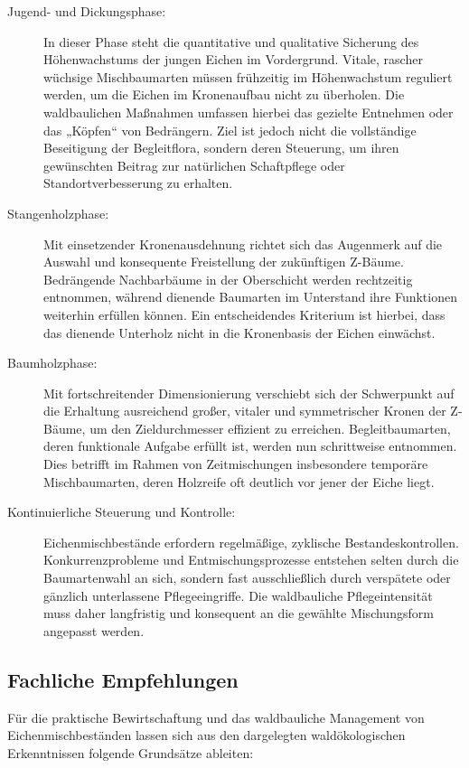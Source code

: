 \documentclass[twocolumn, bibliography=totoc, abstract=true]{scrartcl}
\begin{document}
\begin{description}
\item[Jugend- und Dickungsphase:] In dieser Phase steht die quantitative und qualitative Sicherung des Höhenwachstums der jungen Eichen im Vordergrund. Vitale, rascher wüchsige Mischbaumarten müssen frühzeitig im Höhenwachstum reguliert werden, um die Eichen im Kronenaufbau nicht zu überholen. Die waldbaulichen Maßnahmen umfassen hierbei das gezielte Entnehmen oder das „Köpfen“ von Bedrängern. Ziel ist jedoch nicht die vollständige Beseitigung der Begleitflora, sondern deren Steuerung, um ihren gewünschten Beitrag zur natürlichen Schaftpflege oder Standortverbesserung zu erhalten.
\item[Stangenholzphase:] Mit einsetzender Kronenausdehnung richtet sich das Augenmerk auf die Auswahl und konsequente Freistellung der zukünftigen Z-Bäume. Bedrängende Nachbarbäume in der Oberschicht werden rechtzeitig entnommen, während dienende Baumarten im Unterstand ihre Funktionen weiterhin erfüllen können. Ein entscheidendes Kriterium ist hierbei, dass das dienende Unterholz nicht in die Kronenbasis der Eichen einwächst.
\item[Baumholzphase:] Mit fortschreitender Dimensionierung verschiebt sich der Schwerpunkt auf die Erhaltung ausreichend großer, vitaler und symmetrischer Kronen der Z-Bäume, um den Zieldurchmesser effizient zu erreichen. Begleitbaumarten, deren funktionale Aufgabe erfüllt ist, werden nun schrittweise entnommen. Dies betrifft im Rahmen von Zeitmischungen insbesondere temporäre Mischbaumarten, deren Holzreife oft deutlich vor jener der Eiche liegt.
\item[Kontinuierliche Steuerung und Kontrolle:] Eichenmischbestände erfordern regelmäßige, zyklische Bestandeskontrollen. Konkurrenzprobleme und Entmischungsprozesse entstehen selten durch die Baumartenwahl an sich, sondern fast ausschließlich durch verspätete oder gänzlich unterlassene Pflegeeingriffe. Die waldbauliche Pflegeintensität muss daher langfristig und konsequent an die gewählte Mischungsform angepasst werden.
\end{description}

\subsection{Fachliche Empfehlungen}

Für die praktische Bewirtschaftung und das waldbauliche Management von Eichenmischbeständen lassen sich aus den dargelegten waldökologischen Erkenntnissen folgende Grundsätze ableiten:
\end{document}
